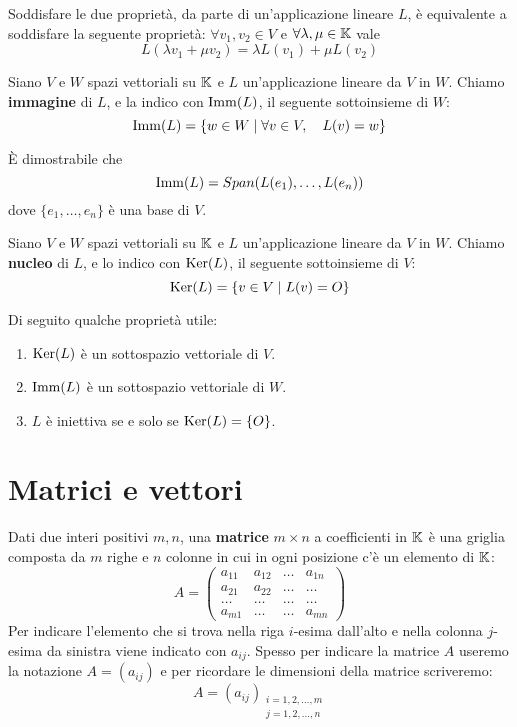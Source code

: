 \begin{observation}
	Soddisfare le due proprietà, da parte di un'applicazione lineare $L$, è equivalente a soddisfare la seguente
	proprietà: $\forall v_1, v_2 \in V$ e $\forall \lambda, \mu \in \mathbb{K}$ vale
	\[ L(\lambda v_1 + \mu v_2) = \lambda L(v_1) + \mu L(v_2) \]
\end{observation}

\begin{definition}
	Siano $V$ e $W$ spazi vettoriali su $\mathbb{K}$ e $L$ un'applicazione lineare da $V$ in $W$. Chiamo
	\textbf{immagine} di $L$, e la indico con $\operatorname{Imm}(L)$, il seguente sottoinsieme di $W$:
	\[ \operatorname{Imm}(L) = \{w \in W \mid \forall v \in V, \quad L(v) = w\} \]
\end{definition}

\begin{proposition}
	È dimostrabile che \[ \operatorname{Imm}(L) = Span(L(e_1), \dots, L(e_n)) \] dove $\{e_1, \dots, e_n\}$ è una base di $V$.
\end{proposition}

\begin{definition}
	Siano $V$ e $W$ spazi vettoriali su $\mathbb{K}$ e $L$ un'applicazione lineare da $V$ in $W$. Chiamo
	\textbf{nucleo} di $L$, e lo indico con $\operatorname{Ker}(L)$, il seguente sottoinsieme di $V$:
	\[ \operatorname{Ker}(L) = \{v \in V \mid L(v) = O\} \]
\end{definition}

Di seguito qualche proprietà utile:
\begin{enumerate}
	\item $\operatorname{Ker}(L)$ è un sottospazio vettoriale di $V$.
	\item $\operatorname{Imm}(L)$ è un sottospazio vettoriale di $W$.
	\item $L$ è iniettiva se e solo se $\operatorname{Ker}(L) = \{O\}$.
\end{enumerate}

\section{Matrici e vettori}

\begin{definition}
	Dati due interi positivi $m, n$, una \textbf{matrice} $m \times n$ a coefficienti in $\mathbb{K}$ è una
	griglia composta da $m$ righe e $n$ colonne in cui in ogni posizione c'è un elemento di $\mathbb{K}$:
	\[
		A = \begin{pmatrix}
			a_{11} & a_{12} & \dots & a_{1n} \\
			a_{21} & a_{22} & \dots & \dots  \\
			\dots  & \dots  & \dots & \dots  \\
			a_{m1} & \dots  & \dots & a_{mn}
		\end{pmatrix}
	\]
	Per indicare l'elemento che si trova nella riga $i$-esima dall'alto e nella colonna $j$-esima da sinistra
	viene indicato con $a_{ij}$. Spesso per indicare la matrice $A$ useremo la notazione $A = (a_{ij})$ e per
	ricordare le dimensioni della matrice scriveremo:
	\[
		A = (a_{ij})_{\substack{
					i = 1, 2, \dots, m \\
					j = 1, 2, \dots, n}}
	\]
\end{definition}

